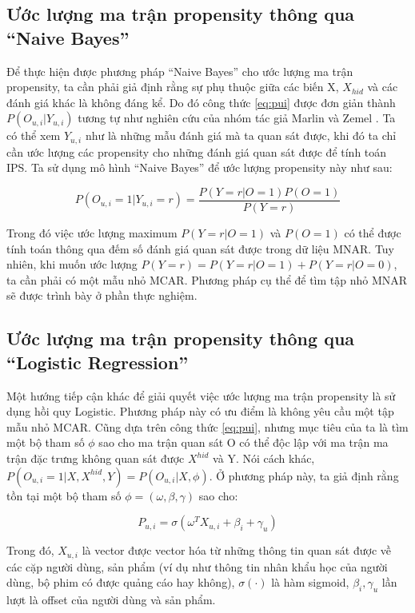 \subsection{Ước lượng ma trận propensity thông qua ``Naive Bayes''}
\label{sec:3_estimate_NB}

Để thực hiện được phương pháp ``Naive Bayes'' cho ước lượng ma trận propensity, ta cần phải giả định rằng sự phụ thuộc giữa các biến X,   $X_{hid}$ và các đánh giá khác là không đáng kể. Do đó công thức \ref{eq:pui} được đơn giản thành $P(O_{u,i}|Y_{u,i})$ tương tự như nghiên cứu của nhóm tác giả Marlin và Zemel \cite{marlin2009}. Ta có thể xem $Y_{u,i}$ như là những mẫu đánh giá mà ta quan sát được, khi đó ta chỉ cần ước lượng các propensity cho những đánh giá quan sát được để tính toán IPS. Ta sử dụng mô hình ``Naive Bayes'' để ước lượng propensity này như sau:

\begin{equation}
\label{eq:pnb}
    P(O_{u,i} = 1| Y_{u,i} = r) = \frac{P(Y=r|O=1)P(O=1)}{P(Y=r)}
\end{equation}

Trong đó việc ước lượng maximum $P(Y=r|O=1)$ và $P(O=1)$ có thể được tính toán thông qua đếm số đánh giá  quan sát được trong dữ liệu MNAR. Tuy nhiên, khi muốn ước lượng $P(Y=r) = P(Y=r|O=1) + P(Y=r|O=0)$, ta cần phải có một mẫu nhỏ MCAR. Phương pháp cụ thể để tìm tập nhỏ MNAR sẽ được trình bày ở phần thực nghiệm.  

\subsection{Ước lượng ma trận propensity thông qua ``Logistic Regression''}
\label{sec:3_estimate_LR}
Một hướng tiếp cận khác để giải quyết việc  ước lượng ma trận propensity là sử dụng hồi quy Logistic. Phương pháp này có ưu điểm là không yêu cầu một tập mẫu nhỏ MCAR. Cũng dựa trên công thức \ref{eq:pui}, nhưng mục tiêu của ta là tìm một bộ tham số $\phi$ sao cho ma trận quan sát O có thể độc lập với ma trận ma
trận đặc trưng không quan sát được $X^{hid}$ và Y. Nói cách khác, $P(O_{u,i} = 1|X, X^{hid},Y) = P(O_{u,i}|X,\phi)$. Ở phương pháp này, ta giả định rằng tồn tại một bộ tham số $\phi=(\omega, \beta, \gamma)$ sao cho:

\begin{equation}
    \label{eq:plr}
    P_{u,i} = \sigma(\omega^TX_{u,i} + \beta_i + \gamma_u)
\end{equation}


Trong đó, $X_{u,i}$ là vector được vector hóa từ những thông tin quan sát được về các cặp người dùng, sản phẩm (ví dụ như thông tin nhân khẩu học của người dùng, bộ phim có được quảng cáo hay không), $\sigma(\cdot)$ là hàm sigmoid, $\beta_i, \gamma_u$ lần lượt là offset của người dùng và sản phẩm.


